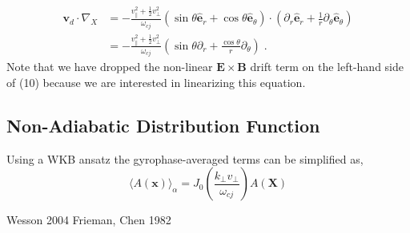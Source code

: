 \documentclass[12pt]{article}
\begin{document}
   \begin{equation}
   \begin{aligned}
      \bm{v}_d\cdot\nabla_X &= -\frac{v_\parallel^2 + \frac{1}{2}v_\perp^2}{\omega_{cj}}(\sin\theta\bm{\hat{e}}_r + \cos\theta\bm{\hat{e}}_\theta)
                              \cdot(\partial_r\bm{\hat{e}}_r + \frac{1}{r}\partial_\theta\bm{\hat{e}}_\theta) \\
                            &= -\frac{v_\parallel^2 + \frac{1}{2}v_\perp^2}{\omega_{cj}}(\sin\theta\partial_r + \frac{\cos\theta}{r}\partial_\theta)\;.
   \end{aligned}
   \end{equation}
Note that we have dropped the non-linear $\bm{E}\times\bm{B}$ drift term on the left-hand side of (10) because we are
interested in linearizing this equation.

\subsection{Non-Adiabatic Distribution Function}
   \quad Using a WKB ansatz the gyrophase-averaged terms can be simplified as,
   \begin{equation}
      \langle A(\bm{x})\rangle_\alpha = J_0(\frac{k_\perp v_\perp}{\omega_{cj}}) A(\bm{X})
   \end{equation}

\begin{thebibliography}{0}
	
    Wesson 2004
    Frieman, Chen 1982
	
\end{thebibliography}
    
\end{document}
